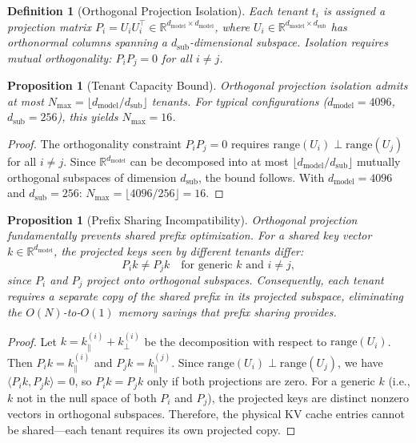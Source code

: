 \documentclass[11pt]{article}
\newtheorem{proposition}[theorem]{Proposition}
\newtheorem{definition}{Definition}
\begin{document}
\begin{definition}[Orthogonal Projection Isolation]
Each tenant $t_i$ is assigned a projection matrix $P_i = U_i U_i^\top \in \mathbb{R}^{d_{\mathrm{model}} \times d_{\mathrm{model}}}$,
where $U_i \in \mathbb{R}^{d_{\mathrm{model}} \times d_{\mathrm{sub}}}$ has orthonormal columns
spanning a $d_{\mathrm{sub}}$-dimensional subspace. Isolation requires mutual orthogonality:
$P_i P_j = 0$ for all $i \neq j$.
\end{definition}

\begin{proposition}[Tenant Capacity Bound]
\label{prop:ortho-capacity}
Orthogonal projection isolation admits at most
$N_{\max} = \lfloor d_{\mathrm{model}} / d_{\mathrm{sub}} \rfloor$
tenants. For typical configurations ($d_{\mathrm{model}} = 4096$, $d_{\mathrm{sub}} = 256$),
this yields $N_{\max} = 16$.
\end{proposition}

\begin{proof}
The orthogonality constraint $P_i P_j = 0$ requires $\mathrm{range}(U_i) \perp \mathrm{range}(U_j)$
for all $i \neq j$. Since $\mathbb{R}^{d_{\mathrm{model}}}$ can be decomposed into at most
$\lfloor d_{\mathrm{model}} / d_{\mathrm{sub}} \rfloor$ mutually orthogonal subspaces
of dimension $d_{\mathrm{sub}}$, the bound follows. With $d_{\mathrm{model}} = 4096$ and
$d_{\mathrm{sub}} = 256$: $N_{\max} = \lfloor 4096 / 256 \rfloor = 16$.
\end{proof}

\begin{proposition}[Prefix Sharing Incompatibility]
\label{prop:ortho-prefix}
Orthogonal projection fundamentally prevents shared prefix optimization. For a shared
key vector $k \in \mathbb{R}^{d_{\mathrm{model}}}$, the projected keys seen by different
tenants differ:
\begin{equation}
    P_i k \neq P_j k \quad \text{for generic } k \text{ and } i \neq j,
\end{equation}
since $P_i$ and $P_j$ project onto orthogonal subspaces. Consequently, each tenant requires
a separate copy of the shared prefix in its projected subspace, eliminating the
$O(N)$-to-$O(1)$ memory savings that prefix sharing provides.
\end{proposition}

\begin{proof}
Let $k = k_\parallel^{(i)} + k_\perp^{(i)}$ be the decomposition with respect to
$\mathrm{range}(U_i)$. Then $P_i k = k_\parallel^{(i)}$ and $P_j k = k_\parallel^{(j)}$.
Since $\mathrm{range}(U_i) \perp \mathrm{range}(U_j)$, we have
$\langle P_i k, P_j k \rangle = 0$, so $P_i k = P_j k$ only if both projections are zero.
For a generic $k$ (i.e., $k$ not in the null space of both $P_i$ and $P_j$), the projected
keys are distinct nonzero vectors in orthogonal subspaces. Therefore, the physical KV cache
entries cannot be shared---each tenant requires its own projected copy.
\end{proof}
\end{document}
